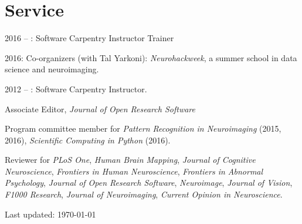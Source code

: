 \documentclass[11pt,fullpage]{article}
\begin{document}
\section*{Service}

2016 -- : Software Carpentry Instructor Trainer

2016: Co-organizers (with Tal Yarkoni): \emph{Neurohackweek}, a summer school in data science and neuroimaging.

2012 -- : Software Carpentry Instructor.

Associate Editor, \emph{Journal of Open Research Software}
\vspace{0.2cm}

Program committee member for \emph{Pattern Recognition in Neuroimaging} (2015, 2016), \emph{Scientific Computing in Python} (2016).

\vspace{0.2cm}

Reviewer for \emph{PLoS One}, \emph{Human Brain Mapping}, \emph{Journal of Cognitive Neuroscience}, \emph{Frontiers in Human Neuroscience}, \emph{Frontiers in Abnormal Psychology}, \emph{Journal of Open Research Software}, \emph{Neuroimage}, \emph{Journal of Vision}, \emph{F1000 Research}, \emph{Journal of Neuroimaging}, \emph{Current Opinion in Neuroscience}.

\bigskip
\begin{center}
  \begin{footnotesize}
    Last updated: \today
  \end{footnotesize}
\end{center}

\end{document}
